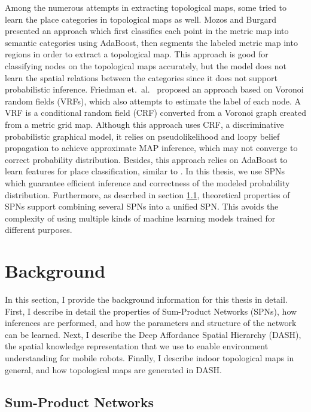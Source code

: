 \documentclass[10pt, titlepage]{article}
\theoremstyle{definition}
\begin{document}
Among the numerous attempts in extracting topological maps, some tried to learn the place categories in topological maps as well. Mozos and Burgard~\cite{mozos2006supervised} presented an approach which first classifies each point in the metric map into semantic categories using AdaBoost, then segments the labeled metric map into regions in order to extract a topological map. This approach is good for classifying nodes on the topological maps accurately, but the model does not learn the spatial relations between the categories since it does not support probabilistic inference. Friedman et.~al.~\cite{friedman2007voronoi} proposed an approach based on Voronoi random fields (VRFs), which also attempts to estimate the label of each node. A VRF is a conditional random field (CRF) converted from a Voronoi graph created from a metric grid map. Although this approach uses CRF, a discriminative probabilistic graphical model, it relies on pseudolikelihood and loopy belief propagation \cite{murphy1999loopy} to achieve approximate MAP inference, which may not converge to correct probability distribution. Besides, this approach relies on AdaBoost to learn features for place classification, similar to \cite{mozos2006supervised}. In this thesis, we use SPNs which guarantee efficient inference and correctness of the modeled probability distribution. Furthermore, as descrbed in section \ref{section:spn}, theoretical properties of SPNs support combining several SPNs into a unified SPN. This avoids the complexity of using multiple kinds of machine learning models trained for different purposes.




\newpage
\section{Background}\label{section:background}

In this section, I provide the background information for this thesis in detail. First, I describe in detail the properties of Sum-Product Networks (SPNs), how inferences are performed, and how the parameters and structure of the network can be learned. Next, I describe the Deep Affordance Spatial Hierarchy (DASH), the spatial knowledge representation that we use to enable environment understanding for mobile robots. Finally, I describe indoor topological maps in general, and how topological maps are generated in DASH.

\subsection{Sum-Product Networks}\label{section:spn}
\end{document}
